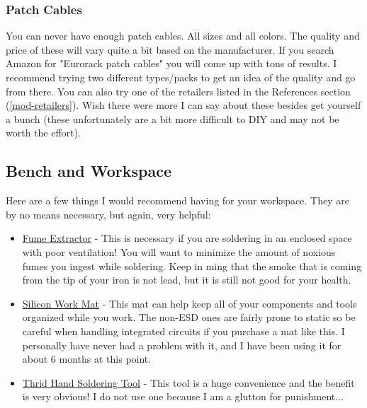 \documentclass{article}
\begin{document}
\subsubsection{Patch Cables}
You can never have enough patch cables. All sizes and all colors. The quality and price of these will vary quite a bit based on the manufacturer. If you search Amazon for "Eurorack patch cables" you will come up with tons of results. I recommend trying two different types/packs to get an idea of the quality and go from there. You can also try one of the retailers listed in the References section (\ref{mod-retailers}). Wish there were more I can say about these besides get yourself a bunch (these unfortunately are a bit more difficult to DIY and may not be worth the effort).

\subsection{Bench and Workspace}
Here are a few things I would recommend having for your workspace. They are by no means necessary, but again, very helpful:
\begin{itemize}
	\item\href{https://www.amazon.com/Absorber-Remover-Extractor-Prevention-Soldering/dp/B07VWDN29F/ref=sr_1_1_sspa?dchild=1&keywords=soldering+fan&qid=1602440986&sr=8-1-spons&psc=1&spLa=ZW5jcnlwdGVkUXVhbGlmaWVyPUExTjNOVzNVMUdTTThNJmVuY3J5cHRlZElkPUEwMzY1NTE1MlpBMjY4TUhKWDFCMiZlbmNyeXB0ZWRBZElkPUEwOTY0NTU1MVA3SFRYMDdPWVIzMyZ3aWRnZXROYW1lPXNwX2F0ZiZhY3Rpb249Y2xpY2tSZWRpcmVjdCZkb05vdExvZ0NsaWNrPXRydWU=}{Fume Extractor} - This is necessary if you are soldering in an enclosed space with poor ventilation! You will want to minimize the amount of noxious fumes you ingest while soldering. Keep in ming that the smoke that is coming from the tip of your iron is not lead, but it is still not good for your health.
	\item\href{https://www.amazon.com/Kaisi-Insulation-Silicone-Position-Soldering/dp/B07DGVRYL3/ref=sr_1_5?dchild=1&keywords=electronics+mat&qid=1602441242&sr=8-5}{Silicon Work Mat} - This mat can help keep all of your components and tools organized while you work. The non-ESD ones are fairly prone to static so be careful when handling integrated circuits if you purchase a mat like this. I personally have never had a problem with it, and I have been using it for about 6 months at this point.
	\item\href{https://www.amazon.com/Helping-Soldering-Workshop-Non-slip-Weighted/dp/B07MDKXNPC/ref=sr_1_3?crid=AB1YXXLOA4I1&dchild=1&keywords=third+hand+soldering+tool&qid=1602441328&sprefix=third+hand+%2Caps%2C143&sr=8-3}{Thrid Hand Soldering Tool} - This tool is a huge convenience and the benefit is very obvious! I do not use one because I am a glutton for punishment...
\end{itemize}
\end{document}
